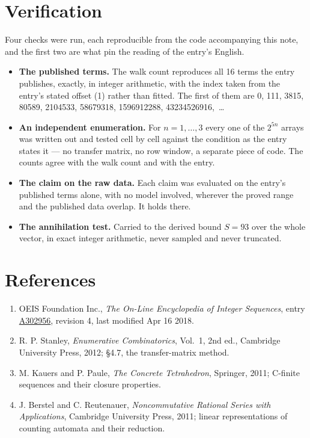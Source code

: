 \documentclass[11pt]{article}
\theoremstyle{definition}
\begin{document}
\section{Verification}

Four checks were run, each reproducible from the code accompanying this note, and the first two are what pin the reading of the entry's English.

\begin{itemize}

\item {\bfseries The published terms.} The walk count reproduces all 16 terms the entry publishes, exactly, in integer arithmetic, with the index taken from the entry's stated offset (1) rather than fitted. The first of them are 0, 111, 3815, 80589, 2104533, 58679318, 1596912288, 43234526916,~\dots

\item {\bfseries An independent enumeration.} For $n = 1,\dots,3$ every one of the $2^{5n}$ arrays was written out and tested cell by cell against the condition as the entry states it --- no transfer matrix, no row window, a separate piece of code. The counts agree with the walk count and with the entry.

\item {\bfseries The claim on the raw data.} Each claim was evaluated on the entry's published terms alone, with no model involved, wherever the proved range and the published data overlap. It holds there.

\item {\bfseries The annihilation test.} Carried to the derived bound $S = 93$ over the whole vector, in exact integer arithmetic, never sampled and never truncated.

\end{itemize}

\section{References}

\begin{enumerate}

\item OEIS Foundation Inc., \emph{The On-Line Encyclopedia of Integer Sequences}, entry \href{https://oeis.org/A302956}{A302956}, revision 4, last modified Apr 16 2018.

\item R. P. Stanley, \emph{Enumerative Combinatorics}, Vol.~1, 2nd ed., Cambridge University Press, 2012; \S4.7, the transfer-matrix method.

\item M. Kauers and P. Paule, \emph{The Concrete Tetrahedron}, Springer, 2011; C-finite sequences and their closure properties.

\item J. Berstel and C. Reutenauer, \emph{Noncommutative Rational Series with Applications}, Cambridge University Press, 2011; linear representations of counting automata and their reduction.

\end{enumerate}
\end{document}
